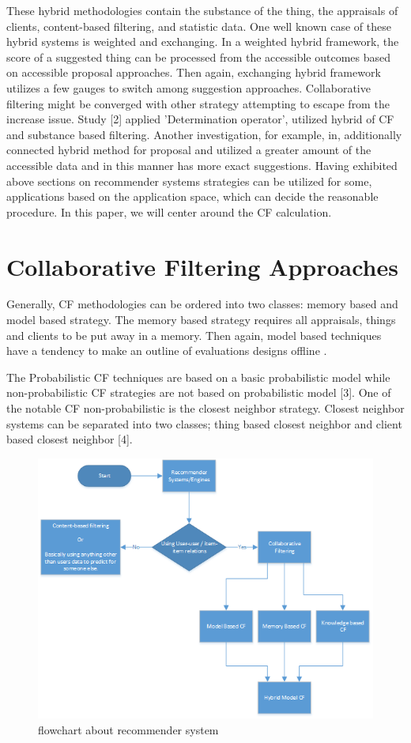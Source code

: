 \documentclass[10pt,conference]{IEEEtran}
\begin{document}
These hybrid methodologies contain the substance of the thing, the appraisals of clients, content-based filtering, and statistic data. One well known case of these hybrid systems is weighted and exchanging. In a weighted hybrid framework, the score of a suggested thing can be processed from the accessible outcomes based on accessible proposal approaches. Then again, exchanging hybrid framework utilizes a few gauges to switch among suggestion approaches. Collaborative filtering might be converged with other strategy attempting to escape from the increase issue. Study [2] applied 'Determination operator', utilized hybrid of CF and substance based filtering. Another investigation, for example, in, additionally connected hybrid method for proposal and utilized a greater amount of the accessible data and in this manner has more exact suggestions.
Having exhibited above sections on recommender systems strategies can be utilized for some, applications based on the application space, which can decide the reasonable procedure. In this paper, we will center around the CF calculation. 

\section{Collaborative Filtering Approaches}
Generally, CF methodologies can be ordered into two classes: memory based and model based strategy. The memory based strategy requires all appraisals, things and clients to be put away in a memory. Then again, model based techniques have a tendency to make an outline of evaluations designs offline \cite{sarwar2001item}.

The Probabilistic CF techniques are based on a basic probabilistic model while non-probabilistic CF strategies are not based on probabilistic model [3]. One of the notable CF non-probabilistic is the closest neighbor strategy. Closest neighbor systems can be separated into two classes; thing based closest neighbor and client based closest neighbor [4]. 


\begin{figure}
\centering
        \includegraphics[width=\textwidth]{images/chart}
    \caption{flowchart about recommender system}
    \label{fig:verticalcell}
\end{figure}
\end{document}
